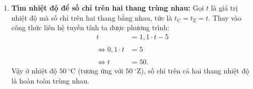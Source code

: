 \begin{vidumau}
{\begin{enumerate}
			\item \textbf{Tìm nhiệt độ để số chỉ trên hai thang trùng nhau:}
			Gọi $t$ là giá trị nhiệt độ mà số chỉ trên hai thang bằng nhau, tức là $t_{\mathrm{C}} = t_{\mathrm{Z}} = t$.
			Thay vào công thức liên hệ tuyến tính ta được phương trình:
		\[
			\begin{aligned}
				t &= 1{,}1 \cdot t - 5 \\\\
				\Leftrightarrow 0{,}1 \cdot t &= 5 \\\\
				\Leftrightarrow t &= 50.
			\end{aligned}
		\]
			Vậy ở nhiệt độ $50\ ^\circ\mathrm{C}$ (tương ứng với $50\ ^\circ\mathrm{Z}$), số chỉ trên cả hai thang nhiệt độ là hoàn toàn trùng nhau.
		\end{enumerate}
	}
\end{vidumau}


